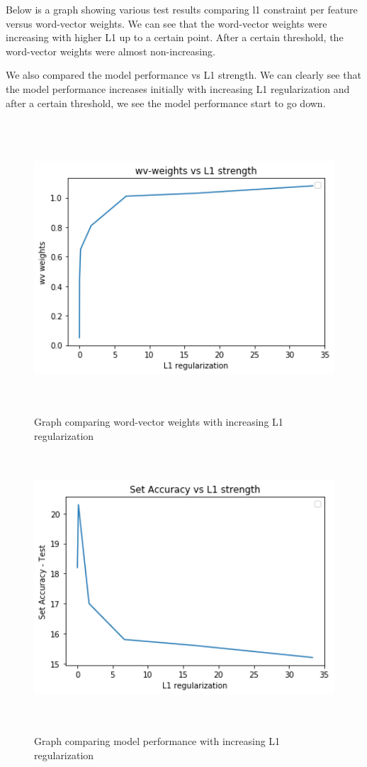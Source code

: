 Below is a graph showing various test results comparing l1 constraint per feature versus word-vector weights. We can see that the word-vector weights were increasing with higher L1 up to a certain point. After a certain threshold, the word-vector weights were almost non-increasing.

We also compared the model performance vs L1 strength. We can clearly see that the model performance increases initially with increasing L1 regularization and after a certain threshold, we see the model performance start to go down.\\\\

\begin{figure}[htbp]
\centering
\includegraphics[width=16cm, height=10cm]{images/graph1.png}\\
\centering
\caption{Graph comparing word-vector weights with increasing L1 regularization}
\label{fig:graph1}
\end{figure}

\begin{figure}[htbp]
\centering
\includegraphics[width=16cm, height=10cm]{images/graph2.png}\\
\centering
\caption{Graph comparing model performance with increasing L1 regularization}
\label{fig:graph2}
\end{figure}


